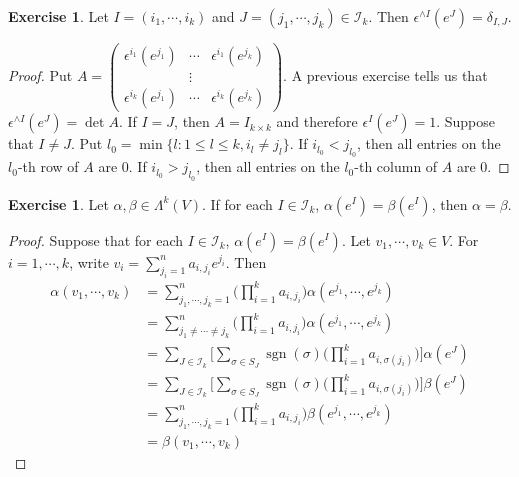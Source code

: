 \documentclass{book}
\theoremstyle{definition}
\newtheorem{ex}[definition]{Exercise}
\newcommand{\al}{\alpha}
\newcommand{\be}{\beta}
\newcommand{\del}{\delta}
\newcommand{\ep}{\epsilon}
\newcommand{\sig}{\sigma}
\newcommand{\Lam}{\Lambda}
\newcommand{\MI}{\mathcal{I}}
\DeclareMathOperator{\sgn}{sgn}
\DeclareMathOperator*{\0}{\mbf{0}}
\DeclareMathOperator*{\1}{\mbf{1}}
\begin{document}
	\begin{ex}
		Let $I = (i_1, \cdots, i_k)$ and $J = (j_1, \cdots, j_k) \in \MI_k$. Then $\ep^{\wedge I} (e^J) = \del_{I,J}$.
	\end{ex}

	\begin{proof}
		Put $A = \begin{pmatrix}
			\ep^{i_1}(e^{j_1}) & \cdots & \ep^{i_1}(e^{j_k}) \\
			& \vdots & \\
			\ep^{i_k}(e^{j_1}) & \cdots & \ep^{i_k}(e^{j_k}) 
		\end{pmatrix}$.
		A previous exercise tells us that $\ep^{\wedge I} (e^J) = \det A$.
		If $I = J$, then $A = I_{k\times k}$ and therefore $\ep^I(e^J) = 1$. Suppose that $I \neq J$. Put $l_0 = \min \{l: 1 \leq l \leq k, i_l \neq j_l\}$. If $i_{l_0} < j_{l_0}$, then all entries on the $l_0$-th row of $A$ are $0$. If $i_{l_0} > j_{l_0}$, then all entries on the $l_0$-th column of $A$ are $0$.
	\end{proof}

	\begin{ex}
		Let $\al , \be \in \Lam^k(V)$. If for each $I \in \MI_k$, $\al(e^I) = \be(e^I)$, then $\al = \be$.
	\end{ex}

	\begin{proof}
		Suppose that for each $I \in \MI_k$, $\al(e^I) = \be(e^I)$. Let $v_1, \cdots, v_k \in V$. For $i = 1, \cdots, k$, write $v_i = \sum_{j_i = 1}^n a_{i,j_i}e^{j_i}$. Then 
		\begin{align*}
			\al(v_1, \cdots, v_k) 
			&= \sum_{j_1, \cdots, j_k =1}^n \bigg( \prod_{i=1}^k a_{i, j_i} \bigg) \al(e^{j_1}, \cdots, e^{j_k}) \\
			&= \sum_{j_1 \neq \cdots \neq j_k}^n \bigg( \prod_{i=1}^k a_{i, j_i} \bigg) \al(e^{j_1}, \cdots, e^{j_k}) \\
			&= \sum_{J \in \MI_k} \bigg [ \sum_{\sig \in S_J} \sgn(\sig) \bigg( \prod_{i=1}^k a_{i, \sig(j_i)} \bigg) \bigg] \al(e^J) \\
			&= \sum_{J \in \MI_k} \bigg [ \sum_{\sig \in S_J} \sgn(\sig) \bigg( \prod_{i=1}^k a_{i, \sig(j_i)} \bigg) \bigg] \be(e^J) \\
			&= \sum_{j_1, \cdots, j_k =1}^n \bigg( \prod_{i=1}^k a_{i, j_i} \bigg) \be(e^{j_1}, \cdots, e^{j_k}) \\
			&= \be(v_1, \cdots, v_k) 
		\end{align*}
	
	\end{proof}
\end{document}

